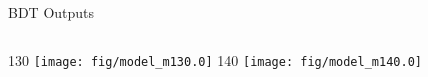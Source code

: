 \documentclass[t, 8pt]{beamer}
\begin{document}
\begin{frame}{BDT Outputs}
  \vspace{1cm}
  \begin{columns}[c]
    130
    \texttt{[image: fig/model\_m130.0]}
    140
    \texttt{[image: fig/model\_m140.0]}
  \end{columns}
\end{frame}
\end{document}
